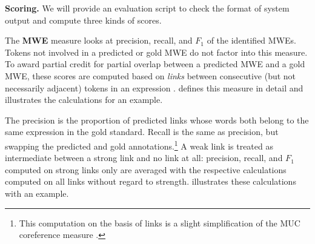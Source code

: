 \documentclass[11pt,letterpaper]{article}
\newcommand{\ensuretext}[1]{#1}
\newcommand{\nssmarker}{\ensuretext{\textcolor{magenta}{\ensuremath{^{\textsc{NS}}_{\textsc{S}}}}}}
\newcommand{\dhmarker}{\ensuretext{\textcolor{red}{\ensuremath{^{\textsc{D}}_{\textsc{H}}}}}}
\newcommand{\arkcomment}[3]{\ensuretext{\textcolor{#3}{[#1 #2]}}}
\newcommand{\nss}[1]{\arkcomment{\nssmarker}{#1}{magenta}}
\newcommand{\dirk}[1]{\arkcomment{\dhmarker}{#1}{red}}
\newcommand{\longversion}[1]{#1} %
\begin{document}

\textbf{Scoring.}
We will provide an evaluation script to check the format of system output and
compute three kinds of scores.



The \textbf{MWE} measure looks at precision, recall, and $F_1$ 
of the identified MWEs. Tokens not involved in a predicted or gold MWE
do not factor into this measure. 
To award partial credit for partial overlap between a predicted MWE 
and a gold MWE, these scores are computed based on \emph{links} between 
consecutive (but not necessarily adjacent) tokens in an expression \citep{schneider-14}.
 defines this measure in detail and illustrates the calculations for an example.

 The precision is the proportion of predicted links whose words 
 both belong to the same expression in the gold standard. 
 Recall is the same as precision, but swapping the predicted and gold annotations.\longversion{\footnote{This computation on the basis of links 
 is a slight simplification of the MUC coreference measure \citep{vilain-95}.}}
 A weak link is treated as intermediate between a strong link and no link at all: 
 precision, recall, and $F_1$ computed on strong links only are averaged 
 with the respective calculations computed on all links without regard to strength. 
  illustrates these calculations with an example.
\end{document}
